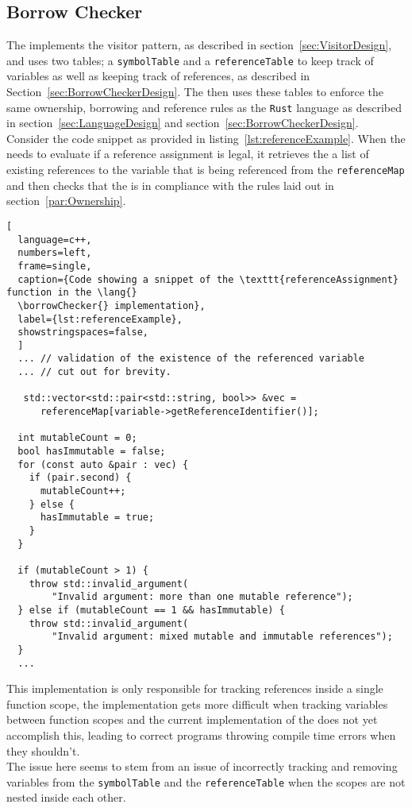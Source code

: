 \subsection{Borrow Checker}
\label{sec:BorrowCheckerImpl}

The \borrowChecker{} implements the visitor pattern, as described in
section~\ref{sec:VisitorDesign}, and uses two tables; a
\texttt{symbolTable} and a \texttt{referenceTable} to keep track of variables as well
as keeping track of references, as described in
Section~\ref{sec:BorrowCheckerDesign}. The \borrowChecker{} then uses these tables to enforce the
same ownership, borrowing and reference rules as the \texttt{Rust} language as described
in section~\ref{sec:LanguageDesign} and section~\ref{sec:BorrowCheckerDesign}. \\

Consider the code snippet as provided in listing~\ref{lst:referenceExample}. When the
\borrowChecker{} needs to evaluate if a reference assignment is legal, it retrieves
the a list of existing references to the variable that is being referenced from the
\texttt{referenceMap} and then checks that the \ast{} is in
compliance with the rules laid out in section~\ref{par:Ownership}.

\begin{lstlisting}[
  language=c++,
  numbers=left,
  frame=single,
  caption={Code showing a snippet of the \texttt{referenceAssignment} function in the \lang{}
  \borrowChecker{} implementation},
  label={lst:referenceExample},
  showstringspaces=false,
  ]
  ... // validation of the existence of the referenced variable 
  ... // cut out for brevity. 

   std::vector<std::pair<std::string, bool>> &vec =
      referenceMap[variable->getReferenceIdentifier()]; 

  int mutableCount = 0;
  bool hasImmutable = false;
  for (const auto &pair : vec) {
    if (pair.second) {
      mutableCount++;
    } else {
      hasImmutable = true;
    }
  }

  if (mutableCount > 1) {
    throw std::invalid_argument(
        "Invalid argument: more than one mutable reference");
  } else if (mutableCount == 1 && hasImmutable) {
    throw std::invalid_argument(
        "Invalid argument: mixed mutable and immutable references");
  }
  ...
\end{lstlisting}

This implementation is only responsible for tracking references inside a single
function scope, the implementation gets more difficult when tracking variables
between function scopes and the current implementation of the \borrowChecker{} does
not yet accomplish this, leading to correct programs throwing compile time errors when
they shouldn't. \\

The issue here seems to stem from an issue of incorrectly tracking and removing
variables from the \texttt{symbolTable} and the \texttt{referenceTable} when the
scopes are not nested inside each other.
